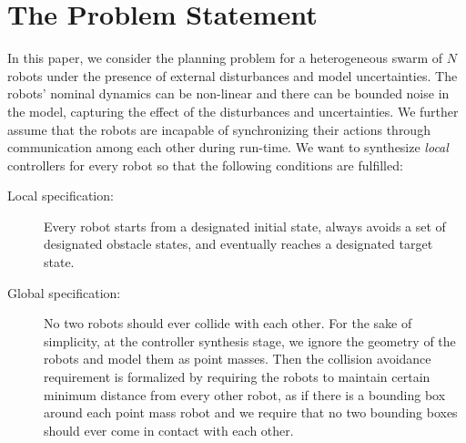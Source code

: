 
\section{The Problem Statement}
In this paper, we consider the planning problem for a heterogeneous swarm of $N$ robots under the presence of external disturbances and model uncertainties. 
The robots' nominal dynamics can be non-linear and there can be bounded noise in the model, capturing the effect of the disturbances and uncertainties.
We further assume that the robots are incapable of synchronizing their actions through communication among each other during run-time.
We want to synthesize \emph{local} controllers for every robot so that the following conditions are fulfilled:
\begin{description}
	\item[Local specification:] Every robot starts from a designated initial state, always avoids a set of designated obstacle states, and eventually reaches a designated target state.
	\item[Global specification:] No two robots should ever collide with each other. 
	For the sake of simplicity, at the controller synthesis stage, we ignore the geometry of the robots and model them as point masses.
	Then the collision avoidance requirement is formalized by requiring the robots to maintain certain minimum distance from every other robot, as if there is a bounding box around each point mass robot and we require that no two bounding boxes should ever come in contact with each other.
\end{description}

